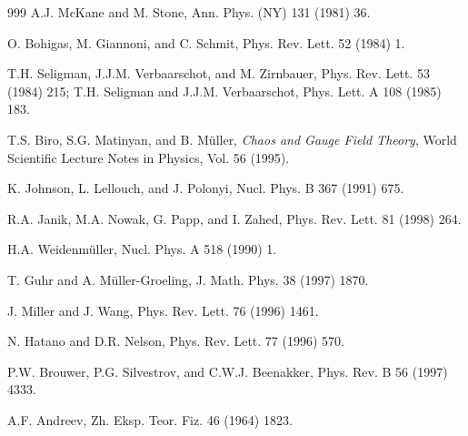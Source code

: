 \begin{thebibliography}{999}
       A.J. McKane and M. Stone, 
                      Ann. Phys. (NY) 131 (1981) 36.              %

      O. Bohigas, M. Giannoni, and C. Schmit, 
                      Phys. Rev. Lett. 52 (1984) 1.               %

      T.H. Seligman, J.J.M. Verbaarschot, and M. Zirnbauer,
                      Phys. Rev. Lett. 53 (1984) 215;             %
                      T.H. Seligman and J.J.M. Verbaarschot, 
                      Phys. Lett. A 108 (1985) 183.               %

        T.S. Biro, S.G. Matinyan, and B. M\"uller,
                      {\it Chaos and Gauge Field Theory}, 
                      World Scientific Lecture Notes in Physics,
                      Vol. 56 (1995).                             %

     K. Johnson, L. Lellouch, and J. Polonyi,
                      Nucl. Phys. B 367 (1991) 675.               %

      R.A. Janik, M.A. Nowak, G. Papp, and I. Zahed,
                      Phys. Rev. Lett. 81 (1998) 264.             %

   H.A. Weidenm\"uller,
                      Nucl. Phys. A 518 (1990) 1.                 %

       T. Guhr and A. M\"uller-Groeling,  
                      J. Math. Phys. 38 (1997) 1870.              %

      J. Miller and J. Wang, 
                      Phys. Rev. Lett. 76 (1996) 1461.            %

      N. Hatano and D.R. Nelson, 
                      Phys. Rev. Lett. 77 (1996) 570.             %

        P.W. Brouwer, P.G. Silvestrov, and C.W.J. Beenakker,
                      Phys. Rev. B 56 (1997) 4333.                %

      A.F. Andreev, 
                      Zh. Eksp. Teor. Fiz. 46 (1964) 1823.        %


\end{thebibliography}
